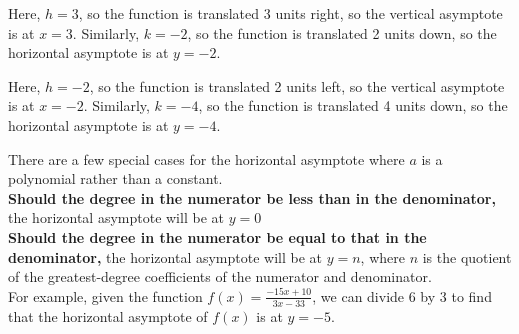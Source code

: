 \documentclass[12pt]{article}
\begin{document}
    Here, \(h=3\), so the function is translated 3 units right, so the vertical asymptote is at \(x=3\). Similarly, \(k=-2\), so the function is translated 2 units down, so the horizontal asymptote is at \(y=-2\).

    \begin{center}
    \end{center}

    Here, \(h=-2\), so the function is translated 2 units left, so the vertical asymptote is at \(x=-2\). Similarly, \(k=-4\), so the function is translated 4 units down, so the horizontal asymptote is at \(y=-4\).

    There are a few special cases for the horizontal asymptote where \(a\) is a polynomial rather than a constant.\\

    \textbf{Should the degree in the numerator be less than in the denominator,} the horizontal asymptote will be at \(y=0\)\\

    \textbf{Should the degree in the numerator be equal to that in the denominator,} the horizontal asymptote will be at \(y=n\), where \(n\) is the quotient of the greatest-degree coefficients of the numerator and denominator.\\
    For example, given the function \(f(x)=\frac{-15x+10}{3x-33}\), we can divide 6 by 3 to find that the horizontal asymptote of \(f(x)\) is at \(y=-5\).\\
\end{document}
